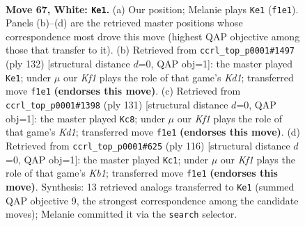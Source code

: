 \documentclass[11pt]{article}
\begin{document}
\clearpage

\begin{figure}[p]\centering
\begin{subfigure}{0.46\textwidth}\centering
\resizebox{\linewidth}{!}{%
\newchessgame
\chessboard[
  setfen={5k2/8/2r5/8/8/8/7R/5K2 w - - 14 67},
  showmover=false,
  pgfstyle=straightmove, color=movearrow, markmove={f1-e1}
]}
\caption{}
\end{subfigure}\hfill
\begin{subfigure}{0.46\textwidth}\centering
\resizebox{\linewidth}{!}{%
\newchessgame
\chessboard[
  setfen={2R5/5r2/8/8/6k1/8/8/3K4 w - - 13 67},
  showmover=false,
  pgfstyle=straightmove, color=movearrow, markmove={d1-e1}
]}
\caption{}
\end{subfigure}
\\[4pt]
\begin{subfigure}{0.46\textwidth}\centering
\resizebox{\linewidth}{!}{%
\newchessgame
\chessboard[
  setfen={3k4/8/7r/8/1R6/8/8/3K4 b - - 10 66},
  showmover=false,
  pgfstyle=straightmove, color=movearrow, markmove={d8-c8}
]}
\caption{}
\end{subfigure}\hfill
\begin{subfigure}{0.46\textwidth}\centering
\resizebox{\linewidth}{!}{%
\newchessgame
\chessboard[
  setfen={2k5/8/6r1/7R/8/8/8/1K6 w - - 18 59},
  showmover=false,
  pgfstyle=straightmove, color=movearrow, markmove={b1-c1}
]}
\caption{}
\end{subfigure}
\caption{\textbf{Move 67, White: \texttt{Ke1}.} (a) Our position; Melanie plays \texttt{Ke1} (\texttt{f1e1}). Panels (b)--(d) are the retrieved master positions whose correspondence most drove this move (highest QAP objective among those that transfer to it). (b) Retrieved from \texttt{ccrl\_top\_p0001\#1497} (ply 132) [structural distance $d$=0, QAP obj=1]: the master played \texttt{Ke1}; under $\mu$ our \emph{Kf1} plays the role of that game's \emph{Kd1}; transferred move \texttt{f1e1} \textbf{(endorses this move)}. (c) Retrieved from \texttt{ccrl\_top\_p0001\#1398} (ply 131) [structural distance $d$=0, QAP obj=1]: the master played \texttt{Kc8}; under $\mu$ our \emph{Kf1} plays the role of that game's \emph{Kd1}; transferred move \texttt{f1e1} \textbf{(endorses this move)}. (d) Retrieved from \texttt{ccrl\_top\_p0001\#625} (ply 116) [structural distance $d$=0, QAP obj=1]: the master played \texttt{Kc1}; under $\mu$ our \emph{Kf1} plays the role of that game's \emph{Kb1}; transferred move \texttt{f1e1} \textbf{(endorses this move)}. Synthesis: 13 retrieved analogs transferred to \texttt{Ke1} (summed QAP objective 9, the strongest correspondence among the candidate moves); Melanie committed it via the \texttt{search} selector.}
\label{fig:thought-m132}
\end{figure}
\end{document}
